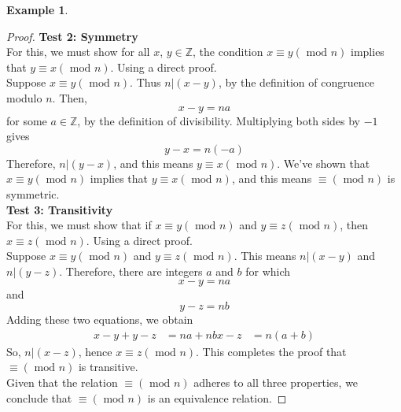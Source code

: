 \documentclass{book}
\theoremstyle{definition}
\newtheorem{example}{Example}[definition]
\theoremstyle{remark}
\newcommand{\bb}[1]{\mathbb{#1}}
\begin{document}
\begin{example}
\begin{proof}
            \textbf{Test 2: Symmetry } \\
                For this, we must show for all $x$, $y \in \bb{Z}$, the condition $x \equiv y (\text{ mod } n)$ implies that $y \equiv x (\text{ mod } n)$. Using a direct proof. \\
                Suppose $x \equiv y (\text{ mod } n)$. Thus $n |(x-y)$, by the definition of congruence modulo $n$. Then, 
                    \begin{equation*}
                        x-y = na         
                    \end{equation*}
                for some $a \in \bb{Z}$, by the definition of divisibility. Multiplying both sides by $-1$ gives
                    \begin{equation*}
                        y-x = n(-a)
                    \end{equation*}
                Therefore, $n |(y-x)$, and this means $y \equiv x (\text{ mod } n)$. We've shown that $x \equiv y (\text{ mod } n)$ implies that $y \equiv x (\text{ mod } n)$, and this means $\equiv (\text{ mod } n)$ is symmetric. \\
            
            \textbf{Test 3: Transitivity } \\    
                For this, we must show that if $x \equiv y (\text{ mod } n)$ and $y \equiv z (\text{ mod } n)$, then $x \equiv z (\text{ mod } n)$. Using a direct proof. \\
                
                Suppose $x \equiv y (\text{ mod } n)$ and $y \equiv z (\text{ mod } n)$. This means $n | (x-y)$ and $n | (y-z)$. Therefore, there are integers $a$ and $b$ for which 
                    \begin{equation*}
                        x-y=na        
                    \end{equation*}
                and 
                    \begin{equation*}
                        y-z=nb
                    \end{equation*}
                Adding these two equations, we obtain 
                    \begin{align*}
                        x-y + y-z   & = na + nb
                        x - z       & = n(a+b) 
                    \end{align*}
                So, $n |(x-z)$, hence $x \equiv z (\text{ mod } n)$. This completes the proof that  $\equiv (\text{ mod } n)$ is transitive. \\
                
        Given that the relation $\equiv (\text{ mod } n)$ adheres to all three properties, we conclude that $\equiv (\text{ mod } n)$ is an equivalence relation.
        \end{proof}
    \end{example}
\end{document}

